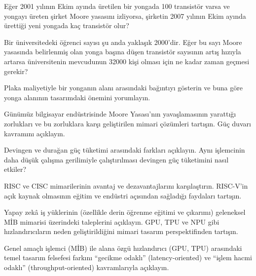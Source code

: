 \begin{alistirma}[\orta]
Eğer 2001 yılının Ekim ayında üretilen bir yongada 100 transistör varsa ve yongayı üreten şirket Moore yasasını izliyorsa, şirketin 2007 yılının Ekim ayında ürettiği yeni yongada kaç transistör olur?
\end{alistirma}

\begin{alistirma}[\orta]
Bir üniversitedeki öğrenci sayısı şu anda yaklaşık 2000'dir. Eğer bu sayı Moore yasasında belirlenmiş olan yonga başına düşen transistör sayısının artış hızıyla artarsa üniversitenin mevcudunun 32000 kişi olması için ne kadar zaman geçmesi gerekir?
\end{alistirma}

\begin{alistirma}[\orta]
Plaka maliyetiyle bir yonganın alanı arasındaki bağıntıyı gösterin ve buna göre yonga alanının tasarımdaki önemini yorumlayın.
\end{alistirma}

\begin{alistirma}[\zor]
Günümüz bilgisayar endüstrisinde Moore Yasası'nın yavaşlamasının yarattığı zorlukları ve bu zorluklara karşı geliştirilen mimari çözümleri tartışın. Güç duvarı kavramını açıklayın.
\end{alistirma}

\begin{alistirma}[\orta]
Devingen ve durağan güç tüketimi arasındaki farkları açıklayın. Aynı işlemcinin daha düşük çalışma gerilimiyle çalıştırılması devingen güç tüketimini nasıl etkiler?
\end{alistirma}

\begin{alistirma}[\zor]
RISC ve CISC mimarilerinin avantaj ve dezavantajlarını karşılaştırın. RISC-V'in açık kaynak olmasının eğitim ve endüstri açısından sağladığı faydaları tartışın.
\end{alistirma}

\begin{alistirma}[\zor]
Yapay zekâ iş yüklerinin (özellikle derin öğrenme eğitimi ve çıkarımı) geleneksel MİB mimarisi üzerindeki taleplerini açıklayın. GPU, TPU ve NPU gibi hızlandırıcıların neden geliştirildiğini mimari tasarım perspektifinden tartışın.
\end{alistirma}

\begin{alistirma}[\orta]
Genel amaçlı işlemci (MİB) ile alana özgü hızlandırıcı (GPU, TPU) arasındaki temel tasarım felsefesi farkını ``gecikme odaklı'' (latency-oriented) ve ``işlem hacmi odaklı'' (throughput-oriented) kavramlarıyla açıklayın.
\end{alistirma}

